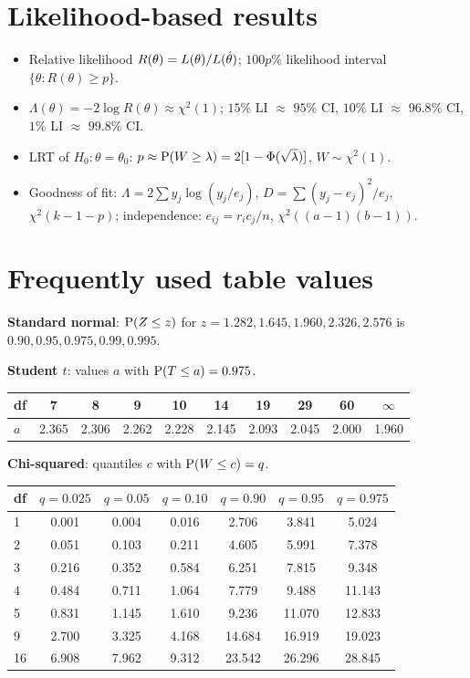 \section{Likelihood-based results}

\begin{itemize}
  \item Relative likelihood $R(\theta) = L(\theta)/L(\hat{\theta})$; $100p\%$ likelihood
        interval $\{\theta: R(\theta)\ge p\}$.
  \item $\Lambda(\theta) = -2\log R(\theta)\approx\chi^2(1)$; $15\%$ LI $\approx$ $95\%$ CI,
        $10\%$ LI $\approx$ $96.8\%$ CI, $1\%$ LI $\approx$ $99.8\%$ CI.
  \item LRT of $H_0:\theta=\theta_0$: $p\approx\operatorname{P}(W\ge\lambda) =
        2[1-\Phi(\sqrt\lambda)]$, $W\sim\chi^2(1)$.
  \item Goodness of fit: $\Lambda = 2\sum y_j\log(y_j/e_j)$, $D = \sum(y_j-e_j)^2/e_j$,
        $\chi^2(k-1-p)$; independence: $e_{ij} = r_ic_j/n$, $\chi^2((a-1)(b-1))$.
\end{itemize}

\section{Frequently used table values}

\textbf{Standard normal}: $\operatorname{P}(Z\le z)$ for $z = 1.282, 1.645, 1.960, 2.326, 2.576$ is
$0.90, 0.95, 0.975, 0.99, 0.995$.

\textbf{Student $t$}: values $a$ with $\operatorname{P}(T\le a) = 0.975$.
\begin{center}
\begin{tabular}{l*{9}{c}}
\toprule
df & 7 & 8 & 9 & 10 & 14 & 19 & 29 & 60 & $\infty$\\
\midrule
$a$ & 2.365 & 2.306 & 2.262 & 2.228 & 2.145 & 2.093 & 2.045 & 2.000 & 1.960\\
\bottomrule
\end{tabular}
\end{center}

\textbf{Chi-squared}: quantiles $c$ with $\operatorname{P}(W\le c) = q$.
\begin{center}
\begin{tabular}{lcccccc}
\toprule
df & $q=0.025$ & $q=0.05$ & $q=0.10$ & $q=0.90$ & $q=0.95$ & $q=0.975$\\
\midrule
1 & 0.001 & 0.004 & 0.016 & 2.706 & 3.841 & 5.024\\
2 & 0.051 & 0.103 & 0.211 & 4.605 & 5.991 & 7.378\\
3 & 0.216 & 0.352 & 0.584 & 6.251 & 7.815 & 9.348\\
4 & 0.484 & 0.711 & 1.064 & 7.779 & 9.488 & 11.143\\
5 & 0.831 & 1.145 & 1.610 & 9.236 & 11.070 & 12.833\\
9 & 2.700 & 3.325 & 4.168 & 14.684 & 16.919 & 19.023\\
16 & 6.908 & 7.962 & 9.312 & 23.542 & 26.296 & 28.845\\
\bottomrule
\end{tabular}
\end{center}

